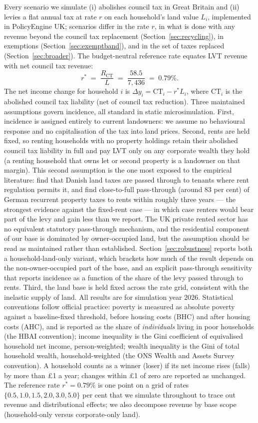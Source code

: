 Every scenario we simulate (i) abolishes council tax in Great Britain and (ii) levies a flat annual tax at rate $r$ on each household's land value $L_i$, implemented in PolicyEngine UK; scenarios differ in the rate $r$, in what is done with any revenue beyond the council tax replacement (Section~\ref{sec:recycling}), in exemptions (Section~\ref{sec:exemptband}), and in the set of taxes replaced (Section~\ref{sec:broader}). The budget-neutral reference rate equates LVT revenue with net council tax revenue:
\begin{equation}
r^{*} \;=\; \frac{R_{\mathrm{CT}}}{L} \;=\; \frac{58.5}{7{,}436} \;=\; 0.79\%.
\label{eq:rate}
\end{equation}
The net income change for household $i$ is $\Delta y_i = \mathrm{CT}_i - r^{*} L_i$, where $\mathrm{CT}_i$ is the abolished council tax liability (net of council tax reduction). Three maintained assumptions govern incidence, all standard in static microsimulation. First, incidence is assigned entirely to current landowners: we assume no behavioural response and no capitalisation of the tax into land prices. Second, rents are held fixed, so renting households with no property holdings retain their abolished council tax liability in full and pay LVT only on any corporate wealth they hold (a renting household that owns let or second property is a landowner on that margin). This second assumption is the one most exposed to the empirical literature: \citet{nielsson2024} find that Danish land taxes are passed through to tenants where rent regulation permits it, and \citet{loeffler2024} find close-to-full pass-through (around 83 per cent) of German recurrent property taxes to rents within roughly three years --- the strongest evidence against the fixed-rent case --- in which case renters would bear part of the levy and gain less than we report. The UK private rented sector has no equivalent statutory pass-through mechanism, and the residential component of our base is dominated by owner-occupied land, but the assumption should be read as maintained rather than established. Section~\ref{sec:robustness} reports both a household-land-only variant, which brackets how much of the result depends on the non-owner-occupied part of the base, and an explicit pass-through sensitivity that reports incidence as a function of the share of the levy passed through to rents. Third, the land base is held fixed across the rate grid, consistent with the inelastic supply of land. All results are for simulation year 2026. Statistical conventions follow official practice: poverty is measured as absolute poverty against a baseline-fixed threshold, before housing costs (BHC) and after housing costs (AHC), and is reported as the share of \emph{individuals} living in poor households (the HBAI convention); income inequality is the Gini coefficient of equivalised household net income, person-weighted; wealth inequality is the Gini of total household wealth, household-weighted (the ONS Wealth and Assets Survey convention). A household counts as a winner (loser) if its net income rises (falls) by more than \pounds 1 a year; changes within \pounds 1 of zero are reported as unchanged. The reference rate $r^{*}=0.79\%$ is one point on a grid of rates $\{0.5, 1.0, 1.5, 2.0, 3.0, 5.0\}$ per cent that we simulate throughout to trace out revenue and distributional effects; we also decompose revenue by base scope (household-only versus corporate-only land).
